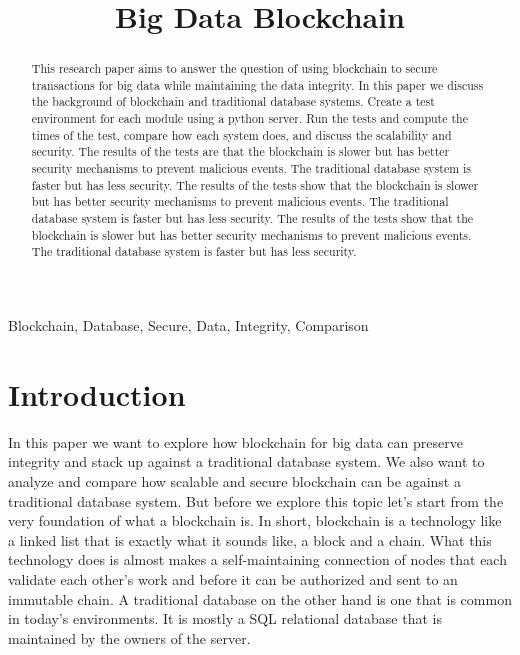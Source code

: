 \documentclass[conference]{IEEEtran} %
\begin{document}
\title{Big Data Blockchain
}

\author{
	}

\maketitle

\begin{abstract} %
	This research paper aims to answer the question of using blockchain to secure transactions for big data while maintaining the data integrity. In this paper we discuss the background of blockchain and traditional database systems. Create a test environment for each module using a python server. Run the tests and compute the times of the test, compare how each system does, and discuss the scalability and security. The results of the tests are that the blockchain is slower but has better security mechanisms to prevent malicious events.
	The traditional database system is faster but has less security. The results of the tests show that the blockchain is slower but has better security mechanisms to prevent malicious events. The traditional database system is faster but has less security. The results of the tests show that the blockchain is slower but has better security mechanisms to prevent malicious events. The traditional database system is faster but has less security.
\end{abstract}

\begin{IEEEkeywords}
	Blockchain, Database, Secure, Data, Integrity, Comparison
\end{IEEEkeywords}

\section{Introduction} %
In this paper we want to explore how blockchain for big data can preserve integrity and stack up against a traditional database system. We also want to analyze and compare how scalable and secure blockchain can be against a traditional database system. But before we explore this topic let’s start from the very foundation of what a blockchain is. In short, blockchain is a technology like a linked list that is exactly what it sounds like, a block and a chain. What this technology does is almost makes a self-maintaining connection of nodes that each validate each other’s work and before it can be authorized and sent to an immutable chain. A traditional database on the other hand is one that is common in today’s environments. It is mostly a SQL relational database that is maintained by the owners of the server.
\end{document}
